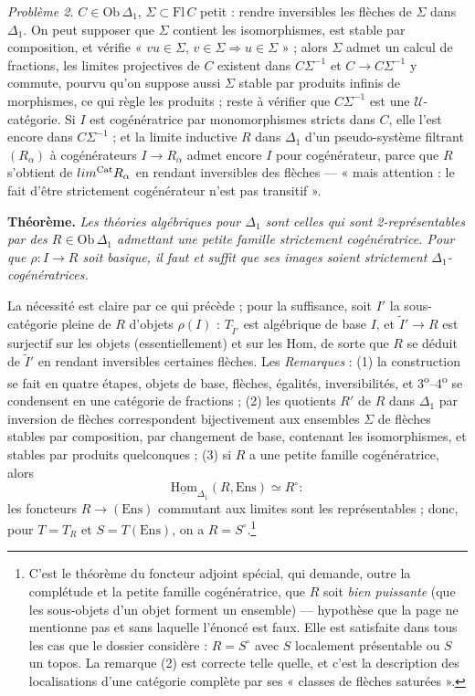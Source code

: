 \documentclass[11pt,a4paper]{article}
\begin{document}
\emph{Problème 2.} $C \in \mathrm{Ob}\,\Delta_{1}$, $\Sigma \subset \mathrm{Fl}
\,C$ petit : rendre inversibles les flèches de $\Sigma$ dans $\Delta_{1}$.
On peut supposer que $\Sigma$ contient les isomorphismes, est stable par
composition, et vérifie « $vu \in \Sigma$, $v \in \Sigma \Rightarrow u \in
\Sigma$ » ; alors $\Sigma$ admet un calcul de fractions, les limites
projectives de $C$ existent dans $C\Sigma^{-1}$ et $C \to C\Sigma^{-1}$ y
commute, pourvu qu'on suppose aussi $\Sigma$ stable par produits infinis de
morphismes, ce qui règle les produits ; reste à vérifier que $C\Sigma^{-1}$
est une $\mathcal{U}$-catégorie. Si $I$ est cogénératrice par
monomorphismes stricts dans $C$, elle l'est encore dans $C\Sigma^{-1}$ ; et
la limite inductive $R$ dans $\Delta_{1}$ d'un pseudo-système filtrant
$(R_{\alpha})$ à cogénérateurs $I \to R_{\alpha}$ admet encore $I$ pour
cogénérateur, parce que $R$ s'obtient de $\varinjlim^{\mathrm{Cat}}
R_{\alpha}$ en rendant inversibles des flèches — « mais attention : le fait
d'être strictement cogénérateur n'est pas transitif ».

\textbf{Théorème.} \emph{Les théories algébriques pour $\Delta_{1}$ sont
celles qui sont 2-représentables par des $R \in \mathrm{Ob}\,\Delta_{1}$
admettant une petite famille strictement cogénératrice. Pour que $\rho : I
\to R$ soit basique, il faut et suffit que ses images soient strictement
$\Delta_{1}$-cogénératrices.}

La nécessité est claire par ce qui précède ; pour la suffisance, soit
$I'$ la sous-catégorie pleine de $R$ d'objets $\rho(I)$ : $T_{\widetilde{I}'}$
est algébrique de base $I$, et $\widetilde{I}' \to R$ est surjectif sur
les objets (essentiellement) et sur les Hom, de sorte que $R$ se déduit
de $\widetilde{I}'$ en rendant inversibles certaines flèches. Les
\emph{Remarques} : (1) la construction se fait en quatre étapes, objets de
base, flèches, égalités, inversibilités, et 3\textsuperscript{o}--4\textsuperscript{o}
se condensent en une catégorie de fractions ; (2) les quotients $R'$ de $R$
dans $\Delta_{1}$ par inversion de flèches correspondent bijectivement aux
ensembles $\Sigma$ de flèches stables par composition, par changement de
base, contenant les isomorphismes, et stables par produits quelconques ;
(3) si $R$ a une petite famille cogénératrice, alors
\[
\underline{\mathrm{Hom}}_{\Delta_{1}}(R, \mathrm{Ens}) \simeq R^{\circ} :
\]
les foncteurs $R \to (\mathrm{Ens})$ commutant aux limites sont les
représentables ; donc, pour $T = T_{R}$ et $S = T(\mathrm{Ens})$, on a $R =
S^{\circ}$.\footnote{C'est le théorème du foncteur adjoint spécial, qui
demande, outre la complétude et la petite famille cogénératrice, que $R$
soit \emph{bien puissante} (que les sous-objets d'un objet forment un
ensemble) — hypothèse que la page ne mentionne pas et sans laquelle
l'énoncé est faux. Elle est satisfaite dans tous les cas que le dossier
considère : $R = S^{\circ}$ avec $S$ localement présentable ou $S$ un
topos. La remarque (2) est correcte telle quelle, et c'est la description
des localisations d'une catégorie complète par ses « classes de flèches
saturées ».}
\end{document}
